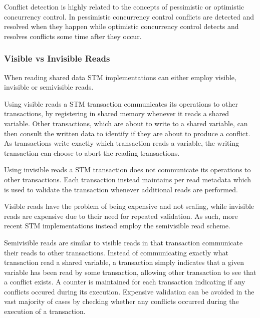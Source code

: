 Conflict detection is highly related to the concepts of pessimistic or optimistic concurrency control. In pessimistic concurrency control conflicts are detected and resolved when they happen\cite[p. 20]{harris2010transactional} while optimistic concurrency control detects and resolves conflicts some time after they occur\cite[p. 20]{harris2010transactional}.

\subsubsection{Visible vs Invisible Reads}
When reading shared data \ac{STM} implementations can either employ visible, invisible or semivisible reads.

Using visible reads a \ac{STM} transaction communicates its operations to other transactions, by registering in shared memory whenever it reads a shared variable\cite[p. 2]{lev2009anatomy}\cite[p. 2085]{herlihy2011tm}. Other transactions, which are about to write to a shared variable, can then consult the written data to identify if they are about to produce a conflict. As transactions write exactly which transaction reads a variable, the writing transaction can choose to abort the reading transactions\cite[p. 2]{lev2009anatomy}.

Using invisible reads a \ac{STM} transaction does not communicate its operations to other transactions\cite[p. 114]{imbs2012virtual}. Each transaction instead maintains per read metadata which is used to validate the transaction whenever additional reads are performed\cite[p. 2085]{herlihy2011tm}.

Visible reads have the problem of being expensive and not scaling, while invisible reads are expensive due to their need for repeated validation. As such, more recent \ac{STM} implementations instead employ the semivisible read scheme\cite[p. 2085]{herlihy2011tm}.

Semivisible reads are similar to visible reads in that transaction communicate their reads to other transactions. Instead of communicating exactly what transaction read a shared variable, a transaction simply indicates that a given variable has been read by some transaction, allowing other transaction to see that a conflict exists. A counter is maintained for each transaction indicating if any conflicts occured during its execution. Expensive validation can be avoided in the vast majority of cases by checking whether any conflicts occurred during the execution of a transaction\cite[p. 2]{lev2009anatomy}.

